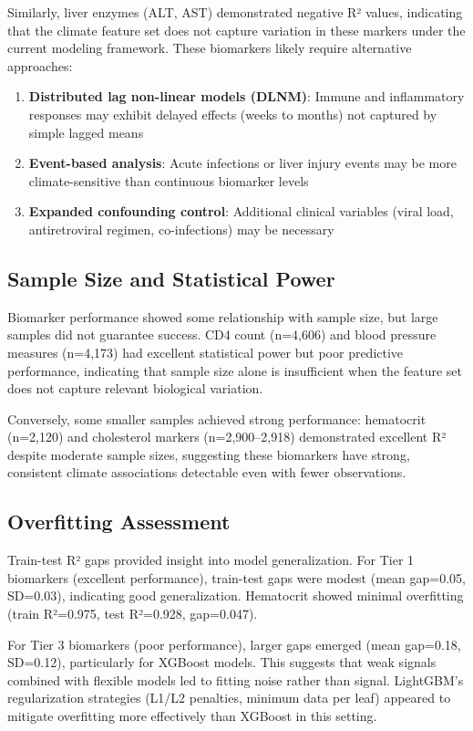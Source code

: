 Similarly, liver enzymes (ALT, AST) demonstrated negative R² values, indicating that the climate feature set does not capture variation in these markers under the current modeling framework. These biomarkers likely require alternative approaches:

\begin{enumerate}
    \item \textbf{Distributed lag non-linear models (DLNM)}: Immune and inflammatory responses may exhibit delayed effects (weeks to months) not captured by simple lagged means
    \item \textbf{Event-based analysis}: Acute infections or liver injury events may be more climate-sensitive than continuous biomarker levels
    \item \textbf{Expanded confounding control}: Additional clinical variables (viral load, antiretroviral regimen, co-infections) may be necessary
\end{enumerate}

\subsection{Sample Size and Statistical Power}

Biomarker performance showed some relationship with sample size, but large samples did not guarantee success. CD4 count (n=4,606) and blood pressure measures (n=4,173) had excellent statistical power but poor predictive performance, indicating that sample size alone is insufficient when the feature set does not capture relevant biological variation.

Conversely, some smaller samples achieved strong performance: hematocrit (n=2,120) and cholesterol markers (n=2,900--2,918) demonstrated excellent R² despite moderate sample sizes, suggesting these biomarkers have strong, consistent climate associations detectable even with fewer observations.

\subsection{Overfitting Assessment}

Train-test R² gaps provided insight into model generalization. For Tier 1 biomarkers (excellent performance), train-test gaps were modest (mean gap=0.05, SD=0.03), indicating good generalization. Hematocrit showed minimal overfitting (train R²=0.975, test R²=0.928, gap=0.047).

For Tier 3 biomarkers (poor performance), larger gaps emerged (mean gap=0.18, SD=0.12), particularly for XGBoost models. This suggests that weak signals combined with flexible models led to fitting noise rather than signal. LightGBM's regularization strategies (L1/L2 penalties, minimum data per leaf) appeared to mitigate overfitting more effectively than XGBoost in this setting.

